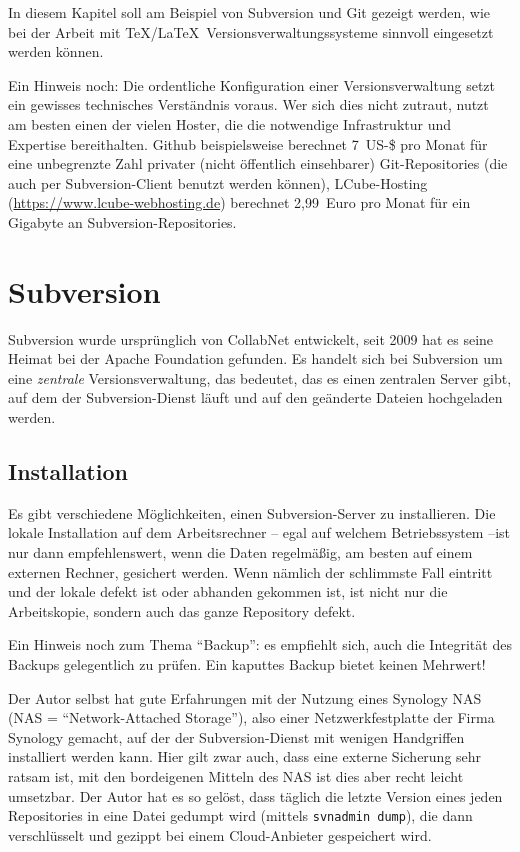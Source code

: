 In diesem Kapitel soll am Beispiel von Subversion und Git gezeigt werden, wie bei der Arbeit mit \TeX/\LaTeX\ Versionsverwaltungssysteme sinnvoll eingesetzt werden können.

Ein Hinweis noch: Die ordentliche Konfiguration einer Versionsverwaltung setzt ein gewisses technisches Verständnis voraus. Wer sich dies nicht zutraut, nutzt am besten einen der vielen Hoster, die die notwendige Infrastruktur und Expertise bereithalten. Github beispielsweise berechnet 7~US-\$ pro Monat für eine unbegrenzte Zahl privater (nicht öffentlich einsehbarer) Git-Repositories (die auch per Subversion-Client benutzt werden können), LCube-Hosting (\url{https://www.lcube-webhosting.de}) berechnet 2,99~Euro pro Monat für ein Gigabyte an Subversion-Repositories.


\section{Subversion}

Subversion wurde ursprünglich von CollabNet entwickelt, seit 2009 hat es seine Heimat bei der Apache Foundation gefunden. Es handelt sich bei Subversion um eine \textit{zentrale} Versionsverwaltung, das bedeutet, das es einen zentralen Server gibt, auf dem der Subversion-Dienst läuft und auf den geänderte Dateien hochgeladen werden.

\subsection{Installation}

Es gibt verschiedene Möglichkeiten, einen Subversion-Server zu installieren. Die lokale Installation auf dem Arbeitsrechner -- egal auf welchem Betriebssystem --ist nur dann empfehlenswert, wenn die Daten regelmäßig, am besten auf einem externen Rechner, gesichert werden. Wenn nämlich der schlimmste Fall eintritt und der lokale defekt ist oder abhanden gekommen ist, ist nicht nur die Arbeitskopie, sondern auch das ganze Repository defekt.

Ein Hinweis noch zum Thema \enquote{Backup}: es empfiehlt sich, auch die Integrität des Backups gelegentlich zu prüfen.
Ein kaputtes Backup bietet keinen Mehrwert!

Der Autor selbst hat gute Erfahrungen mit der Nutzung eines Synology NAS (NAS = \enquote{Network-Attached Storage}), also einer Netzwerkfestplatte der Firma Synology gemacht, auf der der Subversion-Dienst mit wenigen Handgriffen installiert werden kann. 
Hier gilt zwar auch, dass eine externe Sicherung sehr ratsam ist, mit den bordeigenen Mitteln des NAS ist dies aber recht leicht umsetzbar. 
Der Autor hat es so gelöst, dass täglich die letzte Version eines jeden Repositories in eine Datei gedumpt wird (mittels \texttt{svnadmin dump}), die dann verschlüsselt und gezippt bei einem Cloud-Anbieter gespeichert wird.

